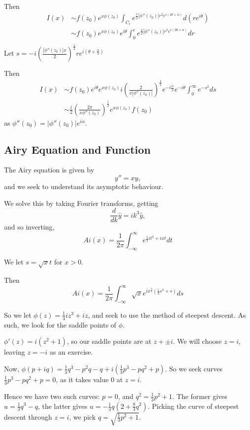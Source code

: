 \documentclass[a4paper]{article}
\begin{document}
Then
 \begin{align*}
	 I(x) &\sim f(z_0) e^{x\phi(z_0)} \int_{C_{\epsilon}} e^{\frac{x}{2} |\phi''(z_0)| r^2 e^{i(2\theta + \alpha)}} d(re^{i\theta}) \\
	 &\sim  f(z_0) e^{x\phi(z_0)} e^{i\theta}\int_{0}^{\epsilon} e^{\frac{x}{2} |\phi''(z_0)| r^2 e^{i(2\theta + \alpha)}} dr \\
\end{align*}
Let $s = -i \left( \frac{|\phi''(z_0)| x}{2} \right)^{\frac{1}{2}} re^{i(\theta + \frac{\alpha}{2})} $ 

Then 
\begin{align*}
	I(x) &\sim f(z_0) e^{i\theta} e^{x\phi(z_0)} i \left( \frac{2}{x |\phi''(z_0)|} \right)^{\frac{1}{2}} e^{-i\frac{\alpha}{2}} e^{-i\theta} \int_{0}^{\infty} e^{-s^2} ds \\
	&\sim  \frac{i}{2} \left( \frac{2\pi}{x\phi''(z_0)} \right)^{\frac{1}{2}} e^{x\phi(z_0)} f(z_0)
\end{align*} as $\phi''(z_0) = |\phi''(z_0)| e^{i\alpha}$.

\subsection*{Airy Equation and Function}

The Airy equation is given by \[
y'' = xy
,\] and we seek to understand its asymptotic behaviour.

We solve this by taking Fourier transforms, getting 
\[
\frac{d}{dk} \hat{y} = ik^3 \hat{y}
,\] and so inverting,
\[
	Ai(x) = \frac{1}{2\pi} \int_{-\infty}^{\infty} e^{\frac{1}{3} it^3 +ixt} dt
\]

We let $s = \sqrt{x} t$ for $x > 0$.

Then
\[
	Ai(x) = \frac{1}{2\pi} \int_{-\infty}^{\infty} \sqrt{x} e^{i x^{\frac{3}{2}} \left( \frac{1}{3} s^3 + s \right) } ds
\]

So we let $\phi(z) = \frac{1}{3} i z^3 + iz$, and seek to use the method of steepest descent. As such, we look for the saddle points of $\phi$.

$\phi'(z) = i(z^2 + 1)$, so our saddle points  are at $z + \pm i$. We will choose  $z= i$, leaving $z=-i$ as an exercise.

Now, $\phi(p+iq) = \frac{1}{3}q^3 - p^2q - q + i\left( \frac{1}{3} p^3 - pq^2 + p \right) $.
So we seek curves $\frac{1}{3} p^3 - pq^2 + p = 0$, as it takes value $0$ at $z=i$.

Hence we have two such curves:  $p=0$, and $q^2 = \frac{1}{3} p^2 + 1$. The former gives $u= \frac{1}{3} q^3 - q$, the latter gives $u = -\frac{1}{3} q\left(2 + \frac{8}{3} q^2  \right) $. Picking the curve of steepest descent through $z=i$, we pick $q = \sqrt{\frac{1}{3} p^2 + 1} $.
\end{document}

